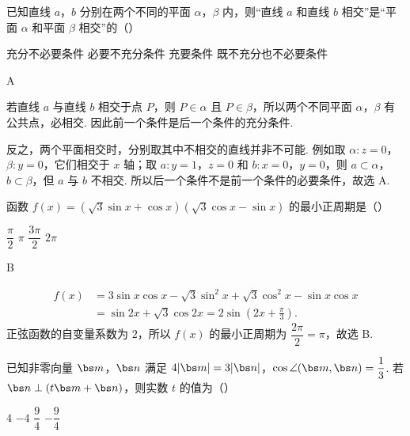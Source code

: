 \begin{problem}
已知直线 \(a\)，\(b\) 分别在两个不同的平面 \(\alpha\)，\(\beta\) 内，则“直线 \(a\) 和直线 \(b\) 相交”是“平面 \(\alpha\) 和平面 \(\beta\) 相交”的（\quad）

\choices
    {充分不必要条件}
    {必要不充分条件}
    {充要条件}
    {既不充分也不必要条件}
\end{problem}

\begin{answer}
A
\end{answer}

\begin{solution}
若直线 \(a\) 与直线 \(b\) 相交于点 \(P\)，则 \(P\in\alpha\) 且 \(P\in\beta\)，所以两个不同平面 \(\alpha\)，\(\beta\) 有公共点，必相交. 因此前一个条件是后一个条件的充分条件.

反之，两个平面相交时，分别取其中不相交的直线并非不可能. 例如取 \(\alpha\colon z=0\)，\(\beta\colon y=0\)，它们相交于 \(x\) 轴；取 \(a\colon y=1\)，\(z=0\) 和 \(b\colon x=0\)，\(y=0\)，则 \(a\subset\alpha\)，\(b\subset\beta\)，但 \(a\) 与 \(b\) 不相交. 所以后一个条件不是前一个条件的必要条件，故选 A.
\end{solution}

\begin{problem}
函数 \(f(x)=\left(\sqrt3\sin x+\cos x\right)\left(\sqrt3\cos x-\sin x\right)\) 的最小正周期是（\quad）

\choices
    {\(\dfrac\pi2\)}
    {\(\pi\)}
    {\(\dfrac{3\pi}{2}\)}
    {\(2\pi\)}
\end{problem}

\begin{answer}
B
\end{answer}

\begin{solution}
\[
\begin{aligned}
f(x)&=3\sin x\cos x-\sqrt3\sin^2x+\sqrt3\cos^2x-\sin x\cos x\\
&=\sin2x+\sqrt3\cos2x=2\sin\left(2x+\frac\pi3\right).
\end{aligned}
\]
正弦函数的自变量系数为 \(2\)，所以 \(f(x)\) 的最小正周期为 \(\dfrac{2\pi}{2}=\pi\)，故选 B.
\end{solution}

\begin{problem}
已知非零向量 \(\bs m\)，\(\bs n\) 满足 \(4|\bs m|=3|\bs n|\)，\(\cos\angle(\bs m,\bs n)=\dfrac13\). 若 \(\bs n\perp\left(t\bs m+\bs n\right)\)，则实数 \(t\) 的值为（\quad）

\choices
    {\(4\)}
    {\(-4\)}
    {\(\dfrac94\)}
    {\(-\dfrac94\)}
\end{problem}

